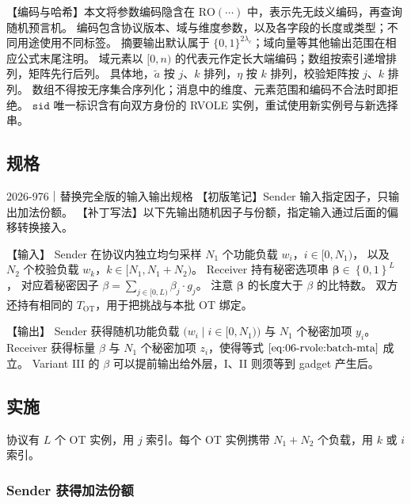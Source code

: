 【编码与哈希】本文将参数编码隐含在 $\mathrm{RO}(\cdots)$ 中，表示先无歧义编码，再查询随机预言机。
编码包含协议版本、域与维度参数，以及各字段的长度或类型；不同用途使用不同标签。
摘要输出默认属于 $\{0,1\}^{2\lambda_c}$；域向量等其他输出范围在相应公式末尾注明。
域元素以 $[0,n)$ 的代表元作定长大端编码；数组按索引递增排列，矩阵先行后列。
具体地，$\tilde a$ 按 $j$、$k$ 排列，$\eta$ 按 $k$ 排列，校验矩阵按 $j$、$k$ 排列。
数组不得按无序集合序列化；消息中的维度、元素范围和编码不合法时即拒绝。
$\mathtt{sid}$ 唯一标识含有向双方身份的 RVOLE 实例，重试使用新实例号与新选择串。

\subsection{规格}

\begin{patchnote}{2026-976｜替换完全版的输入输出规格}
  【初版笔记】Sender 输入指定因子，只输出加法份额。
  【补丁写法】以下先输出随机因子与份额，指定输入通过后面的偏移转换接入。

  【输入】
  Sender 在协议内独立均匀采样 $N_1$ 个功能负载 $w_i$，$i\in[0,N_1)$，
  以及 $N_2$ 个校验负载 $w_k$，$k\in[N_1,N_1+N_2)$。
  Receiver 持有秘密选项串 $\boldsymbol\beta \in \left\{0,1\right\}^L$，
  对应着秘密因子 $\beta=\sum_{j\in[0,L)} \beta_j \cdot g_j$。
  注意 $\boldsymbol\beta$ 的长度大于 $\beta$ 的比特数。
  双方还持有相同的 $T_{\mathrm{OT}}$，用于把挑战与本批 OT 绑定。

  【输出】
  Sender 获得随机功能负载 $\bigl(w_i \mid i\in[0,N_1)\bigr)$ 与 $N_1$ 个秘密加项 $y_i$。
  Receiver 获得标量 $\beta$ 与 $N_1$ 个秘密加项 $z_i$，使得等式 $\eqref{eq:06-rvole:batch-mta}$ 成立。
  Variant III 的 $\beta$ 可以提前输出给外层，I、II 则须等到 gadget 产生后。
\end{patchnote}

\subsection{实施}

协议有 $L$ 个 OT 实例，用 $j$ 索引。每个 OT 实例携带 $N_1+N_2$ 个负载，用 $k$ 或 $i$ 索引。

\subsubsection{Sender 获得加法份额}

